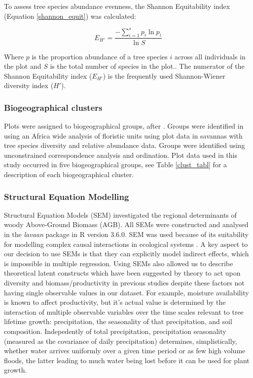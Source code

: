 \documentclass[11pt,a4paper]{article}
\begin{document}
To assess tree species abundance evenness, the Shannon Equitability index \citep{} (Equation \ref{shannon_equit}) was calculated: 

\begin{equation}
	E_{H'} = \frac{-\sum_{i = 1}^{s} p_i \ln{p_i}}{\ln{S}}
	\label{shannon_equit}
\end{equation}

Where $p$ is the proportion abundance of a tree species $i$ across all individuals in the plot and $S$ is the total number of species in the plot.. The numerator of the Shannon Equitability index ($E_{H'}$) is the frequently used Shannon-Wiener diversity index ($H'$).


\subsubsection{Biogeographical clusters}

Plots were assigned to biogeographical groups, after \citet{Fayolle2018}. Groups were identified in \citet{Fayolle2018} using an Africa wide analysis of floristic units using plot data in savannas with tree species diversity and relative abundance data. Groups were identified using unconstrained correspondence analysis and ordination. Plot data used in this study occurred in five biogeographical groups, see Table \ref{clust_tabl} for a description of each biogeographical cluster.


\subsubsection{Structural Equation Modelling}

Structural Equation Models (SEM) investigated the regional determinants of woody Above-Ground Biomass (AGB). All SEMs were constructed and analysed in the \textit{lavaan} package in R version 3.6.0. SEM was used because of its suitability for modelling complex causal interactions in ecological systems \citep{Lehmann2014_161-166}. A key aspect to our decision to use SEMs is that they can explicitly model indirect effects, which is impossible in multiple regression. Using SEMs also allowed us to describe theoretical latent constructs which have been suggested by theory to act upon diversity and biomass/productivity in previous studies despite these factors not having single observable values in our dataset. For example, moisture availability is known to affect productivity, but it's actual value is determined by the interaction of multiple observable variables over the time scales relevant to tree lifetime growth: precipitation, the seasonality of that precipitation, and soil composition. Indepedently of total precipitation, precipitation seasonality (measured as the covariance of daily precipitation) determines, simplistically, whether water arrives uniformly over a given time period or as few high volume floods, the latter leading to much water being lost before it can be used for plant growth. 
\end{document}
